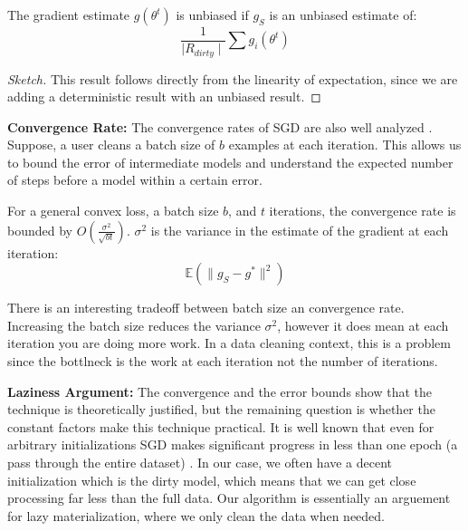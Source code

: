 \begin{lemma}
The gradient estimate $g(\theta^{t})$ is unbiased if $g_S$ is an unbiased estimate of:
\[
\frac{1}{\mid R_{dirty} \mid} \sum g_i(\theta^{t})
\]
\end{lemma}
\begin{proof}[Sketch]
This result follows directly from the linearity of expectation, since we are adding a deterministic result with an unbiased result.
\end{proof}

\vspace{0.5em}

\noindent\textbf{ Convergence Rate: } The convergence rates of SGD are also well analyzed \cite{dekel2012optimal,bertsekas2011incremental,zhao2014stochastic}. 
Suppose, a user cleans a batch size of $b$ examples at each iteration.
This allows us to bound the error of intermediate models and understand the expected number of steps before a model within a certain error. 

\begin{proposition}
For a general convex loss, a batch size $b$, and $t$ iterations, the convergence rate is bounded by $O(\frac{\sigma^2}{\sqrt{bt}})$. 
$\sigma^2$ is the variance in the estimate of the gradient at each iteration:
\[
\mathbb{E}(\|g_S - g^*\|^2)
\]
\end{proposition}

There is an interesting tradeoff between batch size an convergence rate.
Increasing the batch size reduces the variance $\sigma^2$, however it does
mean at each iteration you are doing more work.
In a data cleaning context, this is a problem since the bottlneck is the work at 
each iteration not the number of iterations.

\vspace{0.5em}

\noindent\textbf{ Laziness Argument: } The convergence and the error bounds show that the technique is theoretically justified, but the remaining question is whether the constant factors make this technique practical.
It is well known that even for arbitrary initializations SGD makes significant progress in less than one epoch (a pass through the entire dataset) \cite{bottou2012stochastic}.
In our case, we often have a decent initialization which is the dirty model, which means that we can get close processing far less than the full data.
Our algorithm is essentially an arguement for lazy materialization, where we only clean the data when needed.

